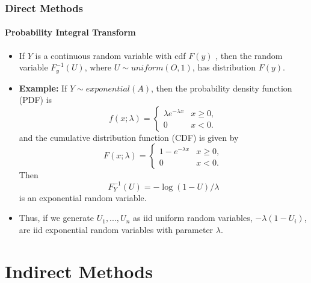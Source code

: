 \documentclass[10pt]{beamer}
\begin{document}
              \begin{frame}
                \frametitle{Direct Methods}
                \framesubtitle{Probability Integral Transform}

                \begin{itemize}
                \item If $Y$ is a continuous random variable with cdf $F(y)$ , then
                  the random variable $F_y^{-1}(U)$, where $U \sim uniform(O, 1)$, has
                  distribution $F(y)$.

                \item \textbf{Example:} If $Y \sim exponential(A)$, then the probability density
                  function (PDF) is
                  \begin{equation*}
                    f(x;\lambda) = \begin{cases} \lambda e^{-\lambda x} & x \ge 0, \\ 0 & x < 0. \end{cases}
                  \end{equation*}
                  and the cumulative distribution function (CDF) is given by
                  \begin{equation*}
                    F(x;\lambda) = \begin{cases} 1-e^{-\lambda x} & x \ge 0, \\ 0 & x < 0. \end{cases}
                  \end{equation*}
                  Then
                  \begin{equation*}
                    F_Y^{-1}(U) = -\log(1-U)/\lambda
                  \end{equation*}
                  is an exponential random variable.

                \item Thus, if we generate $U_1,..., U_n$ as iid uniform random
                  variables, $-\lambda (1-U_i)$, are iid exponential random
                  variables with parameter $\lambda$.

                \end{itemize}

              \end{frame}

              \section{Indirect Methods}
\end{document}
